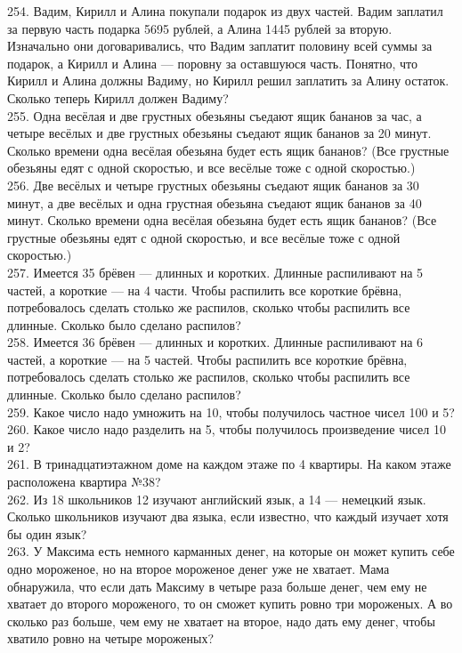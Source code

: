 \documentclass[12pt]{article}
\begin{document}
254. Вадим, Кирилл и Алина покупали подарок из двух частей. Вадим заплатил за первую часть подарка 5695 рублей, а Алина 1445 рублей за вторую. Изначально они договаривались, что Вадим заплатит половину всей суммы за подарок, а Кирилл и Алина --- поровну за оставшуюся часть. Понятно, что Кирилл и Алина должны Вадиму, но Кирилл решил заплатить за Алину остаток. Сколько теперь Кирилл должен Вадиму?\\
255. Одна весёлая и две грустных обезьяны съедают ящик бананов за час, а четыре весёлых и две грустных обезьяны съедают ящик бананов за 20 минут. Сколько времени одна весёлая обезьяна будет есть ящик бананов? (Все грустные обезьяны едят с одной скоростью, и все весёлые тоже с одной скоростью.)\\
256. Две весёлых и четыре грустных обезьяны съедают ящик бананов за 30 минут, а две весёлых и одна грустная обезьяна съедают ящик бананов за 40 минут. Сколько времени одна весёлая обезьяна будет есть ящик бананов? (Все грустные обезьяны едят с одной скоростью, и все весёлые тоже с одной скоростью.)\\
257. Имеется 35 брёвен --- длинных и коротких. Длинные распиливают на 5 частей, а короткие --- на 4 части. Чтобы распилить все короткие брёвна, потребовалось сделать столько же распилов, сколько чтобы распилить все длинные. Сколько было сделано распилов?\\
258. Имеется 36 брёвен --- длинных и коротких. Длинные распиливают на 6 частей, а короткие --- на 5 частей. Чтобы распилить все короткие брёвна, потребовалось сделать столько же распилов, сколько чтобы распилить все длинные. Сколько было сделано распилов?\\
259. Какое число надо умножить на 10, чтобы получилось частное чисел 100 и 5?\\
260. Какое число надо разделить на 5, чтобы получилось произведение чисел 10 и 2?\\
261. В тринадцатиэтажном доме на каждом этаже по 4 квартиры. На каком этаже расположена квартира №38?\\
262. Из 18 школьников 12 изучают английский язык, а 14 --- немецкий язык. Сколько школьников изучают два языка, если известно, что каждый изучает хотя бы один язык?\\
263. У Максима есть немного карманных денег, на которые он может купить себе одно мороженое, но на второе мороженое денег уже не хватает. Мама обнаружила, что если дать Максиму в четыре раза больше денег, чем ему не хватает до второго мороженого, то он сможет купить ровно три мороженых. А во сколько раз больше, чем ему не хватает на второе, надо дать ему денег, чтобы хватило ровно на четыре мороженых?\\
\end{document}

